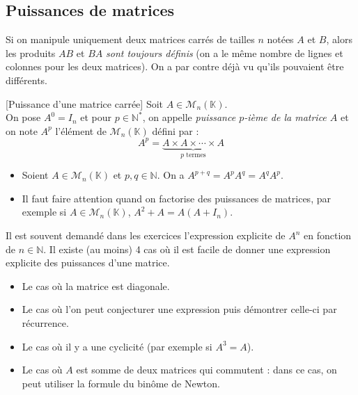 \documentclass[a4paper,10pt]{report}
\begin{document}
\subsection{Puissances de matrices}
Si on manipule uniquement deux matrices carrés de tailles $n$ notées $A$ et $B$, alors les produits $AB$ et $BA$ \emph{sont toujours définis} (on a le même nombre de lignes et colonnes pour les deux matrices). On a par contre déjà vu qu'ils pouvaient être différents. 


\begin{Definition}{}[Puissance d'une matrice carrée]
Soit $A \in \mathcal{M}_{n}(\mathbb{K})$.\\
On pose $A^0=I_n$ et pour $p \in \mathbb{N}^*$, on appelle \emph{puissance $p$-ième de la matrice $A$} et on note $A^p$ l'élément de $\mathcal{M}_n(\mathbb{K})$ défini par :
$$A^p= \underbrace{A \times A \times \cdots \times A}_{p \text{ termes}}$$
\end{Definition}

\begin{Remarques}{}
\begin{itemize}
\item Soient $A \in \mathcal{M}_n(\mathbb{K})$ et $p,q \in \mathbb{N}$. On a $A^{p+q}=A^pA^q=A^qA^p.$
\item Il faut faire attention quand on factorise des puissances de matrices, par exemple si $A \in \mathcal{M}_{n}(\mathbb{K})$, \newline $A^2+A = A( A+I_n)$.
\end{itemize}
\end{Remarques}{}

\begin{metho}
Il est souvent demandé dans les exercices l'expression explicite de $A^n$ en fonction de $n \in \mathbb{N}$. Il existe (au moins) 4 cas où il est facile de donner une expression explicite des puissances d'une matrice.
\begin{itemize}
\item Le cas où la matrice est diagonale.
\item Le cas où l'on peut conjecturer une expression puis démontrer celle-ci par récurrence.
\item Le cas où il y a une cyclicité (par exemple si $A^3=A$).
\item Le cas où $A$ est somme de deux matrices qui commutent : dans ce cas, on peut utiliser la formule du binôme de Newton.
\end{itemize}
\end{metho}
\end{document}

